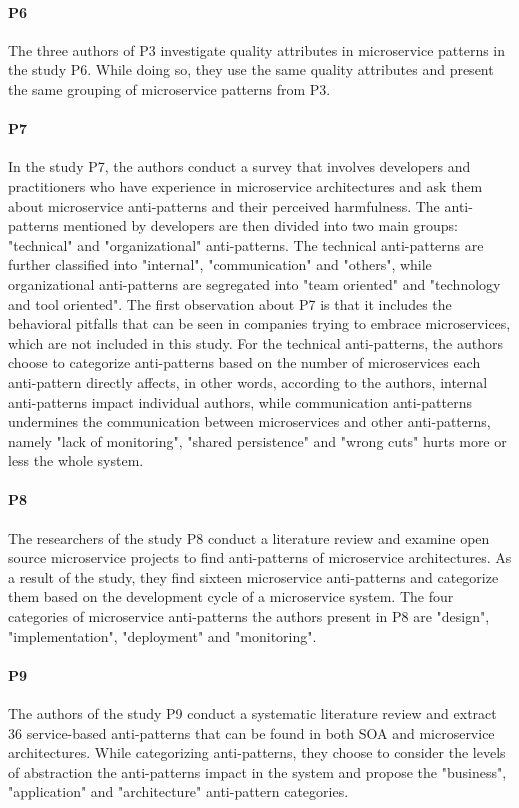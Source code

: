 \documentclass{Configuration_Files/PoliMi3i_thesis}
\begin{document}
\paragraph{P6} The three authors of P3 investigate quality attributes in microservice patterns in the study P6.
While doing so, they use the same quality attributes and present the same grouping of microservice patterns from P3.

\paragraph{P7} In the study P7, the authors conduct a survey that involves developers and practitioners who have experience in microservice architectures and ask them about microservice anti-patterns and their perceived harmfulness.
The anti-patterns mentioned by developers are then divided into two main groups: "technical" and "organizational" anti-patterns.
The technical anti-patterns are further classified into "internal", "communication" and "others", while organizational anti-patterns are segregated into "team oriented" and "technology and tool oriented".
The first observation about P7 is that it includes the behavioral pitfalls that can be seen in companies trying to embrace microservices, which are not included in this study.
For the technical anti-patterns, the authors choose to categorize anti-patterns based on the number of microservices each anti-pattern directly affects, in other words, according to the authors, internal anti-patterns impact individual authors, while communication anti-patterns undermines the communication between microservices and other anti-patterns, namely "lack of monitoring", "shared persistence" and "wrong cuts" hurts more or less the whole system.

\paragraph{P8} The researchers of the study P8 conduct a literature review and examine open source microservice projects to find anti-patterns of microservice architectures.
As a result of the study, they find sixteen microservice anti-patterns and categorize them based on the development cycle of a microservice system.
The four categories of microservice anti-patterns the authors present in P8 are "design", "implementation", "deployment" and "monitoring".

\paragraph{P9} The authors of the study P9 conduct a systematic literature review and extract 36 service-based anti-patterns that can be found in both SOA and microservice architectures.
While categorizing anti-patterns, they choose to consider the levels of abstraction the anti-patterns impact in the system and propose the "business", "application" and "architecture" anti-pattern categories.
\end{document}
